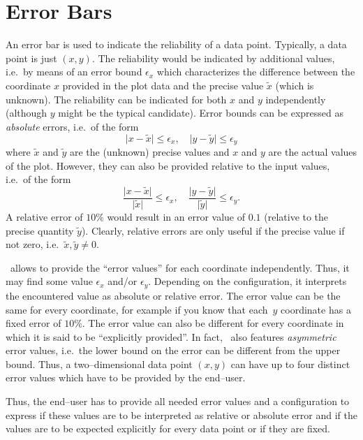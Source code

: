 
\section{Error Bars}
\label{sec:errorbars}
{%
\def\pgfplotserror#1{\ensuremath{\epsilon_{#1}}}%

An error bar is used to indicate the reliability of a data point. Typically, a data point is just $(x,y)$. The reliability would be indicated by additional values, i.e.\ by means of an error bound $\pgfplotserror{x}$ which characterizes the difference between the coordinate $x$ provided in the plot data and the precise value $\tilde x$ (which is unknown). The reliability can be indicated for both $x$ and $y$ independently (although $y$ might be the typical candidate). Error bounds can be expressed as \emph{absolute} errors, i.e.\ of the form
\[ \lvert{x- \tilde x}\rvert \le \pgfplotserror{x}, \quad \lvert{y-\tilde y}\rvert \le \pgfplotserror{y} \]
where $\tilde x$ and $\tilde y$ are the (unknown) precise values and $x$ and $y$ are the actual values of the plot. However, they can also be provided relative to the input values, i.e.\ of the form
\[ \frac{\lvert{x-\tilde x}\rvert} {\lvert\tilde x\rvert} \le \pgfplotserror{x}, \quad \frac{\lvert{y-\tilde y}\rvert} {\lvert\tilde y\rvert} \le \pgfplotserror{y}.\]
A relative error of $10\%$ would result in an error value of $0.1$ (relative to the precise quantity $\tilde y$). Clearly, relative errors are only useful if the precise value if not zero, i.e.\ $\tilde x, \tilde y \neq 0$.

\PGFPlots\ allows to provide the ``error values'' for each coordinate independently. Thus, it may find some value $\pgfplotserror{x}$ and/or $\pgfplotserror{y}$. Depending on the configuration, it interprets the encountered value as absolute or relative error. The error value can be the same for every coordinate, for example if you know that each~$y$ coordinate has a fixed error of $10\%$. The error value can also be different for every coordinate in which it is said to be ``explicitly provided''. In fact, \PGFPlots\ also features \emph{asymmetric} error values, i.e.\ the lower bound on the error can be different from the upper bound. Thus, a two--dimensional data point $(x,y)$ can have up to four distinct error values which have to be provided by the end--user.

Thus, the end--user has to provide all needed error values and a configuration to express if these values are to be interpreted as relative or absolute error and if the values are to be expected explicitly for every data point or if they are fixed.

}
